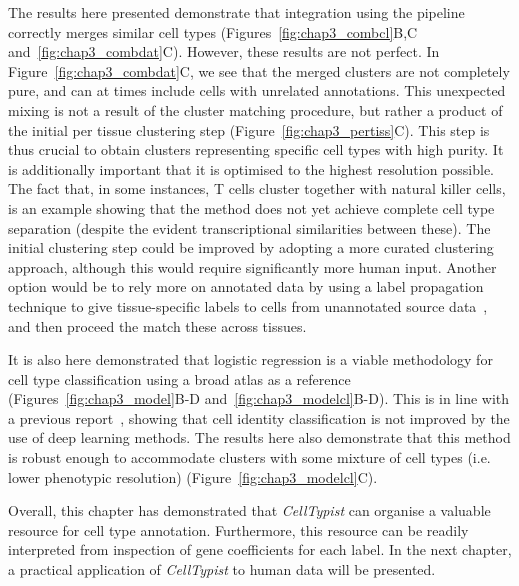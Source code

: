 The results here presented demonstrate that integration using the pipeline correctly merges similar cell types (Figures~\ref{fig:chap3_combcl}B,C and~\ref{fig:chap3_combdat}C). However, these results are not perfect. In Figure~\ref{fig:chap3_combdat}C, we see that the merged clusters are not completely pure, and can at times include cells with unrelated annotations. This unexpected mixing is not a result of the cluster matching procedure, but rather a product of the initial per tissue clustering step (Figure~\ref{fig:chap3_pertiss}C). This step is thus crucial to obtain clusters representing specific cell types with high purity. It is additionally important that it is optimised to the highest resolution possible. The fact that, in some instances, T cells cluster together with natural killer cells, is an example showing that the method does not yet achieve complete cell type separation (despite the evident transcriptional similarities between these). The initial clustering step could be improved by adopting a more curated clustering approach, although this would require significantly more human input. Another option would be to rely more on annotated data by using a label propagation technique to give tissue-specific labels to cells from unannotated source data~\citep{barkas_joint_2019}, and then proceed the match these across tissues.

It is also here demonstrated that logistic regression is a viable methodology for cell type classification using a broad atlas as a reference (Figures~\ref{fig:chap3_model}B-D and~\ref{fig:chap3_modelcl}B-D). This is in line with a previous report~\citep{kohler_deep_2019}, showing that cell identity classification is not improved by the use of deep learning methods. The results here also demonstrate that this method is robust enough to accommodate clusters with some mixture of cell types (i.e. lower phenotypic resolution) (Figure~\ref{fig:chap3_modelcl}C).

Overall, this chapter has demonstrated that \textit{CellTypist} can organise a valuable resource for cell type annotation. Furthermore, this resource can be readily interpreted from inspection of gene coefficients for each label. In the next chapter, a practical application of \textit{CellTypist} to human data will be presented.